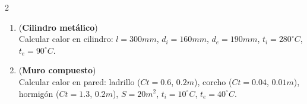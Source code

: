 \documentclass[a4paper,12pt]{article}
\begin{document}
\begin{multicols}{2}
\begin{enumerate}
\item (\textbf{Cilindro metálico})\\
Calcular calor en cilindro: $l=300mm$, $d_i=160mm$, $d_e=190mm$, $t_i=280^\circ C$, $t_e=90^\circ C$.

\item (\textbf{Muro compuesto})\\
Calcular calor en pared: ladrillo ($Ct=0.6$, $0.2m$), corcho ($Ct=0.04$, $0.01m$), hormigón ($Ct=1.3$, $0.2m$), $S=20m^2$, $t_i=10^\circ C$, $t_e=40^\circ C$.
\end{enumerate}

\vspace{0.2cm}


\end{multicols}
\end{document}
